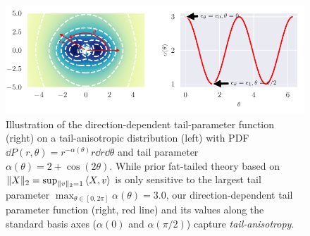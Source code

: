 \documentclass{article}
\theoremstyle{definition}
\newtheorem{definition}[theorem]{Definition}
\theoremstyle{remark}
\begin{document}
\begin{figure}[htbp]
  \centering
  \includegraphics{../Figures/radial-fat-tail.pdf}%
  \vspace{-3mm}
  \caption{
    Illustration of the direction-dependent tail-parameter function (right) on a tail-anisotropic distribution (left)
    with PDF $\dd P(r,\theta) = r^{-\alpha(\theta)} r \dd r \dd\theta$ and tail parameter $\alpha(\theta) = 2 + \cos(2\theta)$.
    While prior fat-tailed theory based on $\|X\|_2 = \sup_{\|v\|_2 = 1} \braket{X,v}$
    is only sensitive to the largest tail parameter $\max_{\theta \in [0, 2\pi]} \alpha(\theta) = 3.0$,
    our direction-dependent tail parameter function (right, red line)
    and its values along the standard basis axes ($\alpha(0)$ and $\alpha(\pi/2)$)
    capture \emph{tail-anisotropy}.
  }
  \label{fig:radial-fat-tail}
\end{figure}



\end{document}
